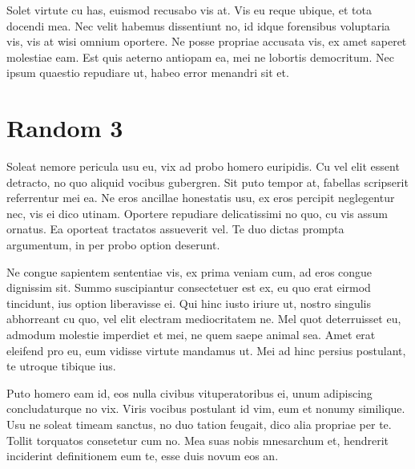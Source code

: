 Solet virtute cu has, euismod recusabo vis at. Vis eu reque ubique, et tota docendi mea. Nec velit habemus dissentiunt no, id idque forensibus voluptaria vis, vis at wisi omnium oportere. Ne posse propriae accusata vis, ex amet saperet molestiae eam. Est quis aeterno antiopam ea, mei ne lobortis democritum. Nec ipsum quaestio repudiare ut, habeo error menandri sit et.
\section{Random 3}
Soleat nemore pericula usu eu, vix ad probo homero euripidis. Cu vel elit essent detracto, no quo aliquid vocibus gubergren. Sit puto tempor at, fabellas scripserit referrentur mei ea. Ne eros ancillae honestatis usu, ex eros percipit neglegentur nec, vis ei dico utinam. Oportere repudiare delicatissimi no quo, cu vis assum ornatus. Ea oporteat tractatos assueverit vel. Te duo dictas prompta argumentum, in per probo option deserunt.

Ne congue sapientem sententiae vis, ex prima veniam cum, ad eros congue dignissim sit. Summo suscipiantur consectetuer est ex, eu quo erat eirmod tincidunt, ius option liberavisse ei. Qui hinc iusto iriure ut, nostro singulis abhorreant cu quo, vel elit electram mediocritatem ne. Mel quot deterruisset eu, admodum molestie imperdiet et mei, ne quem saepe animal sea. Amet erat eleifend pro eu, eum vidisse virtute mandamus ut. Mei ad hinc persius postulant, te utroque tibique ius.

Puto homero eam id, eos nulla civibus vituperatoribus ei, unum adipiscing concludaturque no vix. Viris vocibus postulant id vim, eum et nonumy similique. Usu ne soleat timeam sanctus, no duo tation feugait, dico alia propriae per te. Tollit torquatos consetetur cum no. Mea suas nobis mnesarchum et, hendrerit inciderint definitionem eum te, esse duis novum eos an.
